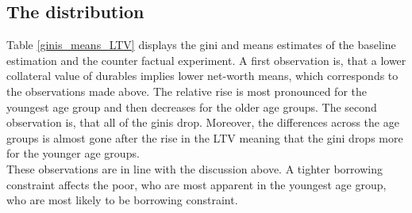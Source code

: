 \documentclass[a4paper,12pt,legno]{article}
\begin{document}
\subsection{The distribution}
Table \ref{ginis_means_LTV} displays the gini and means estimates of the baseline estimation and the counter factual experiment. A first observation is, that a lower collateral value of durables implies lower net-worth means, which corresponds to the observations made above. The relative rise is most pronounced for the youngest age group and then decreases for the older age groups. 
The second observation is, that all of the ginis drop. Moreover, the differences across the age groups is almost gone after the rise in the LTV meaning that the gini drops more for the younger age groups. \\ These observations are in line with the discussion above. A tighter borrowing constraint affects the poor, who are most apparent in the youngest age group, who are most likely to be borrowing constraint. 
\end{document}
